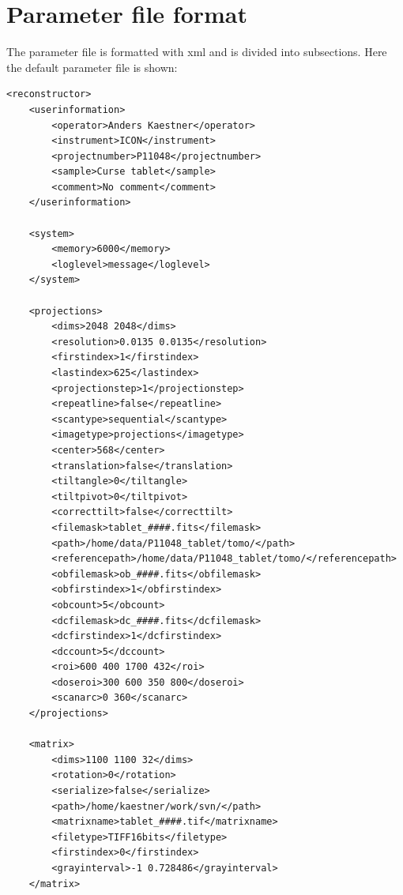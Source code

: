 \documentclass[a4paper]{scrreprt}
\begin{document}
\chapter{Parameter file format}\label{sec_fileformat}
The parameter file is formatted with xml and is divided into subsections.
Here the default parameter file is shown:
\begin{verbatim}
<reconstructor>
    <userinformation>
        <operator>Anders Kaestner</operator>
        <instrument>ICON</instrument>
        <projectnumber>P11048</projectnumber>
        <sample>Curse tablet</sample>
        <comment>No comment</comment>
    </userinformation>

    <system>
        <memory>6000</memory>
        <loglevel>message</loglevel>
    </system>

    <projections>
        <dims>2048 2048</dims>
        <resolution>0.0135 0.0135</resolution>
        <firstindex>1</firstindex>
        <lastindex>625</lastindex>
        <projectionstep>1</projectionstep>
        <repeatline>false</repeatline>
        <scantype>sequential</scantype>
        <imagetype>projections</imagetype>
        <center>568</center>
        <translation>false</translation>
        <tiltangle>0</tiltangle>
        <tiltpivot>0</tiltpivot>
        <correcttilt>false</correcttilt>
        <filemask>tablet_####.fits</filemask>
        <path>/home/data/P11048_tablet/tomo/</path>
        <referencepath>/home/data/P11048_tablet/tomo/</referencepath>
        <obfilemask>ob_####.fits</obfilemask>
        <obfirstindex>1</obfirstindex>
        <obcount>5</obcount>
        <dcfilemask>dc_####.fits</dcfilemask>
        <dcfirstindex>1</dcfirstindex>
        <dccount>5</dccount>
        <roi>600 400 1700 432</roi>
        <doseroi>300 600 350 800</doseroi>
        <scanarc>0 360</scanarc>
    </projections>

    <matrix>
        <dims>1100 1100 32</dims>
        <rotation>0</rotation>
        <serialize>false</serialize>
        <path>/home/kaestner/work/svn/</path>
        <matrixname>tablet_####.tif</matrixname>
        <filetype>TIFF16bits</filetype>
        <firstindex>0</firstindex>
        <grayinterval>-1 0.728486</grayinterval>
    </matrix>


\end{verbatim}
\end{document}
